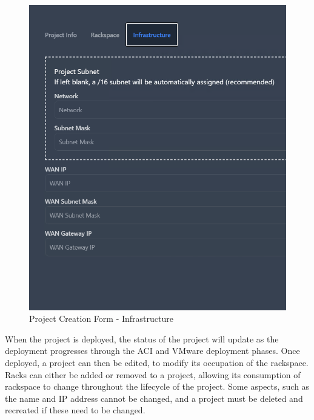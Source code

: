 \begin{figure}[H]
    \centering
    \includegraphics[width=0.8\linewidth]{images/add-project-infrastructure.png}
    \caption{Project Creation Form - Infrastructure}
    \label{fig:userguide1}
\end{figure}

When the project is deployed, the status of the project will update as the deployment progresses through the ACI and VMware deployment phases. Once deployed, a project can then be edited, to modify its occupation of the rackspace. Racks can either be added or removed to a project, allowing its consumption of rackspace to change throughout the lifecycle of the project. Some aspects, such as the name and IP address cannot be changed, and a project must be deleted and recreated if these need to be changed.